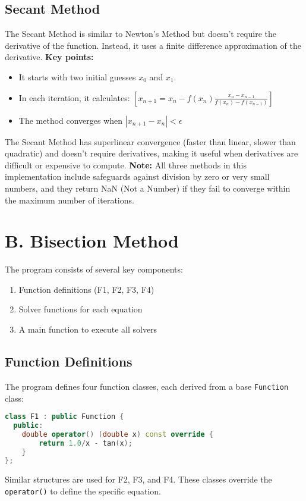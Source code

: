 \documentclass{article}
\begin{document}
\subsection{Secant Method}
The Secant Method is similar to Newton's Method but doesn't require the derivative of the function. Instead, it uses a finite difference approximation of the derivative.
\textbf{Key points:}
\begin{itemize}
\item It starts with two initial guesses $x_0$ and $x_1$.
\item In each iteration, it calculates:
$[ x_{n+1} = x_n - f(x_n) \frac{x_n - x_{n-1}}{f(x_n) - f(x_{n-1})} ]$
\item The method converges when $|x_{n+1} - x_n| < \epsilon$
\end{itemize}
The Secant Method has superlinear convergence (faster than linear, slower than quadratic) and doesn't require derivatives, making it useful when derivatives are difficult or expensive to compute.
\textbf{Note:} All three methods in this implementation include safeguards against division by zero or very small numbers, and they return NaN (Not a Number) if they fail to converge within the maximum number of iterations.



\section{B. Bisection Method}
The program consists of several key components:
\begin{enumerate}
\item Function definitions (F1, F2, F3, F4)
\item Solver functions for each equation
\item A main function to execute all solvers
\end{enumerate}
\subsection{Function Definitions}
The program defines four function classes, each derived from a base \texttt{Function} class:
\begin{lstlisting}[language=C++]
class F1 : public Function {
  public:
    double operator() (double x) const override {
        return 1.0/x - tan(x);
    }
};
\end{lstlisting}
Similar structures are used for F2, F3, and F4. These classes override the \texttt{operator()} to define the specific equation.
\end{document}
